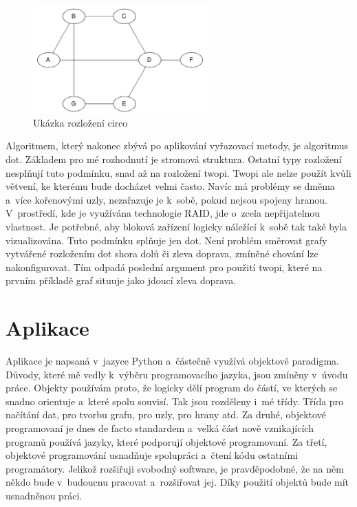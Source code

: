\documentclass[color,table,oneside,nolot,nolof]{fithesis}
\begin{document}
\begin{figure}[h!]
	\label{Ukázka rozložení circo}
	\caption{Ukázka rozložení circo}
	\centering
	\includegraphics[width=0.6\textwidth]{pictures/circo_example.png} 
\end{figure}

	Algoritmem, který nakonec zbývá po aplikování vyřazovací metody, je algoritmus dot. 
	Základem pro mé rozhodnutí je stromová struktura. Ostatní typy rozložení nesplňují tuto podmínku, snad až na rozložení twopi. Twopi ale nelze použít kvůli větvení,
	ke kterému bude docházet velmi často. Navíc má problémy se dměma a~více kořenovými uzly, nezařazuje je k~sobě, pokud nejsou spojeny hranou. V~prostředí, kde je využívána technologie
	RAID, jde o~zcela nepřijatelnou vlastnost. Je potřebné, aby bloková zařízení logicky náležící k~sobě tak také byla vizualizována. Tuto podmínku splňuje
	jen dot. Není problém směrovat grafy 
	vytvářené rozložením dot shora dolů či zleva doprava, zmíněné chování lze nakonfigurovat. Tím odpadá poslední argument pro použití twopi, které na prvním příkladě graf situuje jako
	jdoucí zleva doprava.

\chapter{Aplikace}
	Aplikace je napsaná v~jazyce Python a~částečně využívá objektové paradigma. Důvody, které mě vedly k~výběru programovacího jazyka, jsou zmíněny v~úvodu práce. Objekty používám proto, že logicky
	dělí program do částí, ve kterých se snadno orientuje a~které spolu souvisí. Tak jsou rozděleny i~mé třídy. Třída pro načítání dat, pro tvorbu grafu, pro uzly, pro hrany atd.
	Za druhé, objektové programovaní je dnes de facto standardem a~velká část nově vznikajících programů používá jazyky, které podporují objektové programovaní. Za třetí,
	objektové programování usnadňuje spolupráci a~čtení kódu ostatními programátory. Jelikož rozšiřuji svobodný software, je pravděpodobné, že na něm někdo bude v~budoucnu pracovat
	a~rozšiřovat jej. Díky použití objektů bude mít usnadněnou práci.
	
\end{document}
